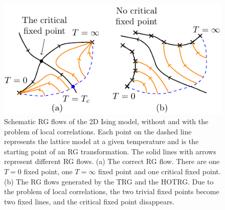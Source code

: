 \documentclass[aps,prr,reprint,superscriptaddress,nofootinbib,floatfix]{revtex4-2}
\begin{document}
\begin{figure}[t]
    \includegraphics[scale=0.9,valign=c]{tensorRGflowSchem.pdf}
    \caption{\label{fig:tensorRGflow}
        Schematic RG flows of the 2D Ising model, without and with the problem of local correlations.
        Each point on the dashed line represents the lattice model at a given temperature and is the starting point of an RG transformation.
        The solid lines with arrows represent different RG flows.
        (a) The correct RG flow. There are one $T=0$ fixed point, one $T=\infty$ fixed point and one critical fixed point.
        (b) The RG flows generated by the TRG and the HOTRG\@.
        Due to the problem of local correlations, the two trivial fixed points become two fixed lines, and the critical fixed point disappears.
    }
\end{figure}
%
\end{document}
